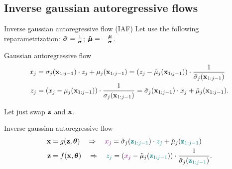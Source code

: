 \documentclass{beamer}
\begin{document}
\subsection{Inverse gaussian autoregressive flows}
\begin{frame}{Inverse gaussian autoregressive flow (IAF)}
	Let use the following reparametrization:
	$\tilde{\boldsymbol{\sigma}} = \frac{1}{\boldsymbol{\sigma}}$; $ \tilde{\boldsymbol{\mu}} = - \frac{\boldsymbol{\mu}}{\boldsymbol{\sigma}}$.
	
	\begin{block}{Gaussian autoregressive flow}
		\vspace{-0.5cm}
		\begin{align*}
			x_j &= \sigma_j (\mathbf{x}_{1:j-1}) \cdot z_j + \mu_j(\mathbf{x}_{1:j-1}) =  \left( z_j - \tilde{\mu}_j(\mathbf{x}_{1:j-1})\right) \cdot \frac{1}{\tilde{\sigma}_j (\mathbf{x}_{1:j-1}) }\\
			z_j &= \left(x_j - \mu_j(\mathbf{x}_{1:j-1}) \right) \cdot \frac{1}{ \sigma_j (\mathbf{x}_{1:j-1})} = \tilde{\sigma}_j (\mathbf{x}_{1:j-1}) \cdot x_j + \tilde{\mu}_j(\mathbf{x}_{1:j-1}).
		\end{align*}
		\vspace{-0.3cm}
	\end{block}
	Let just swap $\mathbf{z}$ and $\mathbf{x}$. 
	
	\begin{block}{Inverse gaussian autoregressive flow}
		\vspace{-0.5cm}
		\begin{align*}
			\mathbf{x} &= g(\mathbf{z}, \boldsymbol{\theta}) \quad \Rightarrow \quad {\color{violet}x_j} = \tilde{\sigma}_j ({\color{teal}\mathbf{z}_{1:j-1}}) \cdot {\color{teal} z_j} + \tilde{\mu}_j({\color{teal}\mathbf{z}_{1:j-1}}) \\
			\mathbf{z} &= f(\mathbf{x}, \boldsymbol{\theta}) \quad \Rightarrow \quad {\color{teal}z_j} = \left( {\color{violet} x_j} - \tilde{\mu}_j({\color{teal}\mathbf{z}_{1:j-1}})\right) \cdot \frac{1}{\tilde{\sigma}_j ({\color{teal}\mathbf{z}_{1:j-1}}) }.
		\end{align*}
		\vspace{-0.3cm}
	\end{block}
	
\end{frame}
\end{document}
